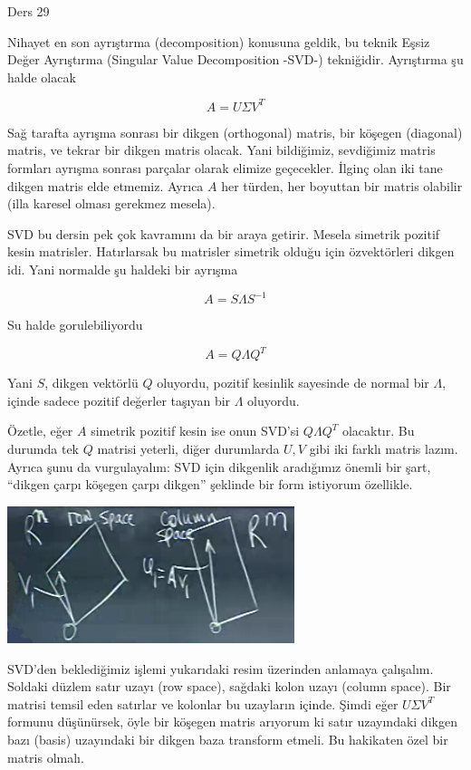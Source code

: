 \documentclass[12pt,fleqn]{article}\usepackage{../../common}
\begin{document}
Ders 29

Nihayet en son ayrıştırma (decomposition) konusuna geldik, bu teknik Eşsiz Değer
Ayrıştırma (Singular Value Decomposition -SVD-) tekniğidir. Ayrıştırma şu halde
olacak

$$ A = U \Sigma V^T $$

Sağ tarafta ayrışma sonrası bir dikgen (orthogonal) matris, bir köşegen
(diagonal) matris, ve tekrar bir dikgen matris olacak. Yani bildiğimiz,
sevdiğimiz matris formları ayrışma sonrası parçalar olarak elimize
geçecekler. İlginç olan iki tane dikgen matris elde etmemiz. Ayrıca $A$
her türden, her boyuttan bir matris olabilir (illa karesel olması gerekmez
mesela).

SVD bu dersin pek çok kavramını da bir araya getirir. Mesela simetrik
pozitif kesin matrisler. Hatırlarsak bu matrisler simetrik olduğu için
özvektörleri dikgen idi. Yani normalde şu haldeki bir ayrışma

$$ A = S \Lambda S ^{-1}   $$

Su halde gorulebiliyordu

$$ A = Q \Lambda Q ^{T}   $$

Yani $S$, dikgen vektörlü $Q$ oluyordu, pozitif kesinlik sayesinde de
normal bir $\Lambda$, içinde sadece pozitif değerler taşıyan bir  $\Lambda$
oluyordu. 

Özetle, eğer $A$ simetrik pozitif kesin ise onun SVD'si $Q \Lambda Q ^{T}$
olacaktır. Bu durumda tek $Q$ matrisi yeterli, diğer durumlarda $U,V$ gibi
iki farklı matris lazım. Ayrıca şunu da vurgulayalım: SVD için dikgenlik
aradığımız önemli bir şart, ``dikgen çarpı köşegen çarpı dikgen''
şeklinde bir form istiyorum özellikle. 

\includegraphics[height=4cm]{29_1.png}

SVD'den beklediğimiz işlemi yukarıdaki resim üzerinden anlamaya
çalışalım. Soldaki düzlem satır uzayı (row space), sağdaki kolon uzayı
(column space). Bir matrisi temsil eden satırlar ve kolonlar bu uzayların
içinde. Şimdi eğer $U \Sigma V^T$ formunu düşünürsek, öyle bir köşegen
matris arıyorum ki satır uzayındaki dikgen bazı (basis) uzayındaki bir
dikgen baza transform etmeli. Bu hakikaten özel bir matris olmalı.
\end{document}
